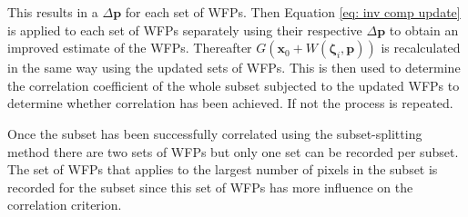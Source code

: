 \documentclass[12pt,oneside,openany,a4paper, %
english, %
masters-t, goldenblock]{usthesis}
\begin{document}
This results in a $\Delta \bm{p}$ for each set of WFPs. Then Equation \ref{eq: inv comp update} is applied to each set of WFPs separately using their respective $\Delta \bm{p}$ to obtain an improved estimate of the WFPs. Thereafter $G(\bm{x}_0+W(\bm{\zeta}_i,\bm{p}))$ is recalculated in the same way using the updated sets of WFPs. This is then used to determine the correlation coefficient of the whole subset subjected to the updated WFPs to determine whether correlation has been achieved. If not the process is repeated.

Once the subset has been successfully correlated using the subset-splitting method there are two sets of WFPs but only one set can be recorded per subset. The set of WFPs that applies to the largest number of pixels in the subset is recorded for the subset since this set of WFPs has more influence on the correlation criterion. 
\end{document}
